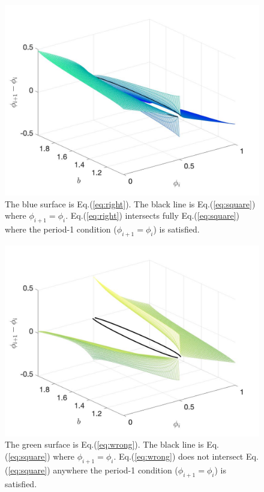 \begin{figure}[H]
    \begin{center}
    \includegraphics[width=.8\textwidth]{figures/3dplot1.jpg}
    \end{center}
\caption{The blue surface is Eq.(\ref{eq:right}). The black line is Eq.(\ref{eq:square}) where $\phi_{i+1}=\phi_i$. Eq.(\ref{eq:right}) intersects fully Eq.(\ref{eq:square}) where the period-1 condition ($\phi_{i+1}=\phi_i$) is satisfied.}
\label{instabbound}
\end{figure}


\begin{figure}
    \begin{center}
    \includegraphics[width=.8\textwidth]{figures/3dplot2.jpg}
    \end{center}
    \caption{The green surface is Eq.(\ref{eq:wrong}). The black line is Eq.(\ref{eq:square}) where $\phi_{i+1}=\phi_i$. Eq.(\ref{eq:wrong}) does not intersect Eq.(\ref{eq:square}) anywhere the period-1 condition ($\phi_{i+1}=\phi_i$) is satisfied.}
    \label{instabbound_restric}
\end{figure}